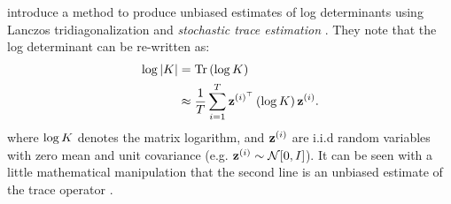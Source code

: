 \citet{ubaru2017fast} introduce a method to produce unbiased estimates of log determinants using Lanczos tridiagonalization and \emph{stochastic trace estimation} \cite{hutchinson1990stochastic,avron2011randomized,fitzsimons2016improved}.
They note that the log determinant can be re-written as:
%
\begin{align}
  \log \vert \bK \vert &= \tr{ \log \bK }
  \nonumber \\
  &\approx \frac{1}{T} \sum_{i=1}^T \bz^{(i)^\top} \left( \log \bK \right) \bz^{(i)}.
  \label{eqn:logdet_sta}
\end{align}
%
where $\log K$ denotes the matrix logarithm, and $\mathbf{z}^{(i)}$ are i.i.d random variables with zero mean and unit covariance (e.g. $\bz^{(i)} \sim \normaldist{0}{\bI}$).
It can be seen with a little mathematical manipulation that the second line is an unbiased estimate of the trace operator \cite{hutchinson1990stochastic}.

